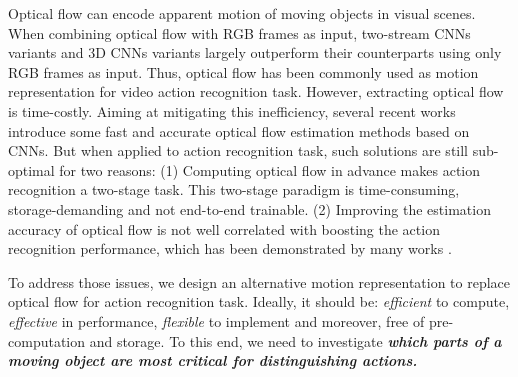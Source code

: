 \documentclass[journal]{IEEEtran}
\begin{document}
Optical flow can encode apparent motion of moving objects in visual scenes. When combining optical flow with RGB frames as input, two-stream CNNs variants \cite{simonyan2014two,feichtenhofer2016convolutional,Zhang2018RealTimeAR,wang2016temporal,zhu2017hidden} and 3D CNNs variants \cite{ji20133d,tran2015learning,qiu2017learning,carreira2017quo} largely outperform their counterparts using only RGB frames as input. Thus, optical flow has been commonly used as motion representation for video action recognition task. However, extracting optical flow is time-costly. Aiming at mitigating this inefficiency, several recent works \cite{dosovitskiy2015flownet,ilg2017flownet,ranjan2017optical,sun2018pwc} introduce some fast and accurate optical flow estimation methods based on CNNs. But when applied to action recognition task, such solutions are still sub-optimal for two reasons: (1) Computing optical flow in advance makes action recognition a two-stage task. This two-stage paradigm is time-consuming, storage-demanding and not end-to-end trainable. (2) Improving the estimation accuracy of optical flow is not well correlated with boosting the action recognition performance, which has been demonstrated by many works \cite{sevilla2017integration,ng2018actionflownet,zhu2017hidden}. 







To address those issues, we design an alternative motion representation to replace optical flow for action recognition task. Ideally, it should be: \emph{efficient} to compute, \emph{effective} in performance, \emph{flexible} to implement and moreover, free of pre-computation and storage. To this end, we need to investigate \textbf{\emph{which parts of a moving object are most critical for distinguishing actions.}} 
\end{document}
